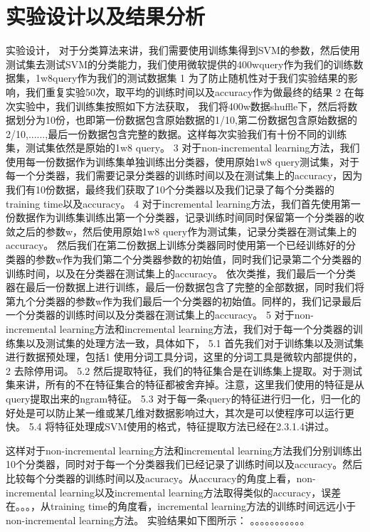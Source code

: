 \documentclass[master]{njuthesis}
\begin{document}
\section{ 实验设计以及结果分析}

实验设计，
对于分类算法来讲，我们需要使用训练集得到SVM的参数，然后使用测试集去测试SVM的分类能力，我们使用微软提供的400wquery作为我们的训练数据集，1w8query作为我们的测试数据集
1 为了防止随机性对于我们实验结果的影响，我们重复实验50次，取平均的训练时间以及accuracy作为做最终的结果
2 在每次实验中，我们训练集按照如下方法获取， 我们将400w数据shuffle下，然后将数据划分为10份，也即第一份数据包含原始数据的1/10,第二份数据包含原始数据的2/10,......,最后一份数据包含完整的数据。这样每次实验我们有十份不同的训练集，测试集依然是原始的1w8 query。
3 对于non-incremental learning方法，我们使用每一份数据作为训练集单独训练出分类器，使用原始1w8 query测试集，对于每一个分类器，我们需要记录分类器的训练时间以及在测试集上的accuracy，因为我们有10份数据，最终我们获取了10个分类器以及我们记录了每个分类器的training time以及accuracy。
4 对于incremental learning方法，我们首先使用第一份数据作为训练集训练出第一个分类器，记录训练时间同时保留第一个分类器的收敛之后的参数w，然后使用原始1w8 query作为测试集，记录分类器在测试集上的accuracy。
然后我们在第二份数据上训练分类器同时使用第一个已经训练好的分类器的参数w作为我们第二个分类器参数的初始值，同时我们记录第二个分类器的训练时间，以及在分类器在测试集上的accuracy。
依次类推，我们最后一个分类器在最后一份数据上进行训练，最后一份数据包含了完整的全部数据，同时我们将第九个分类器的参数w作为我们最后一个分类器的初始值。同样的，我们记录最后一个分类器的训练时间以及分类器在测试集上的accuracy。
5 对于non-incremental learning方法和incremental learning方法，我们对于每一个分类器的训练集以及测试集的处理方法一致，具体如下，
5.1 首先我们对于训练集以及测试集进行数据预处理，包括1 使用分词工具分词，这里的分词工具是微软内部提供的，2 去除停用词。
5.2 然后提取特征，我们的特征集合是在训练集上提取。对于测试集来讲，所有的不在特征集合的特征都被舍弃掉。注意，这里我们使用的特征是从query提取出来的ngram特征。
5.3 对于每一条query的特征进行归一化，归一化的好处是可以防止某一维或某几维对数据影响过大，其次是可以使程序可以运行更快。
5.4 将特征处理成SVM使用的格式，特征提取方法已经在2.3.1.4讲过。

这样对于non-incremental learning方法和incremental learning方法我们分别训练出10个分类器，同时对于每一个分类器我们已经记录了训练时间以及accuracy。然后比较每个分类器的训练时间以及acuracy。从accuracy的角度上看，non-incremental learning以及incremental learning方法取得类似的accuracy，误差在。。。，从training time的角度看，incremental learning方法的训练时间远远小于non-incremental learning方法。
实验结果如下图所示：
。。。。。。。。。。。
\end{document}
